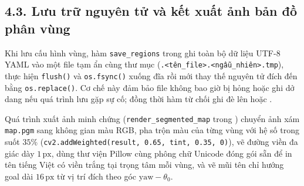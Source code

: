 \subsection*{4.3. Lưu trữ nguyên tử và kết xuất ảnh bản đồ phân vùng}

Khi lưu cấu hình vùng, hàm \texttt{save\_regions} trong  ghi toàn bộ dữ liệu UTF-8 YAML vào một file tạm ẩn cùng thư mục (\texttt{.<tên\_file>.<ngẫu\_nhiên>.tmp}), thực hiện \texttt{flush()} và \texttt{os.fsync()} xuống đĩa rồi mới thay thế nguyên tử đích đến bằng \texttt{os.replace()}. Cơ chế này đảm bảo file  không bao giờ bị hỏng hoặc ghi dở dang nếu quá trình lưu gặp sự cố; đồng thời hàm từ chối ghi đè lên  hoặc .

Quá trình xuất ảnh minh chứng (\texttt{render\_segmented\_map} trong ) chuyển ảnh xám \texttt{map.pgm} sang không gian màu RGB, pha trộn màu của từng vùng với hệ số trong suốt $35\%$ (\texttt{cv2.addWeighted(result, 0.65, tint, 0.35, 0)}), vẽ đường viền đa giác dày $1\,\text{px}$, dùng thư viện Pillow cùng phông chữ Unicode đóng gói sẵn  để in tên tiếng Việt có viền trắng tại trọng tâm mỗi vùng, và vẽ mũi tên chỉ hướng goal dài $16\,\text{px}$ từ vị trí đích theo góc $\text{yaw} - \theta_0$.
